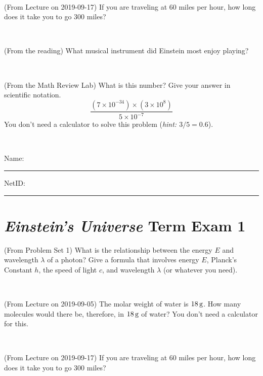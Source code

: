 \documentclass[12pt, letterpaper]{article}
\begin{document}
\vfill ~

\begin{problem} (From Lecture on 2019-09-17)
If you are traveling at 60 miles per hour, how long does
it take you to go 300 miles?
\end{problem}


\vfill ~

\begin{problem} (From the reading)
What musical instrument did Einstein most enjoy playing?
\end{problem}


\vfill ~

\begin{problem} (From the Math Review Lab)
What is this number? Give your answer in scientific notation.
$$
\frac{(7\times10^{-34})\times(3\times10^8)}{5\times10^{-7}}
$$
You don't need a calculator to solve this problem (\textit{hint: $3/5=0.6$}).
\end{problem}


\vfill ~


\cleardoublepage



\noindent
Name: \rule[-1ex]{0.60\textwidth}{0.1pt}
NetID: \rule[-1ex]{0.20\textwidth}{0.1pt}

\section*{\textsl{Einstein's Universe} Term Exam 1}
\setcounter{problem}{1}


\begin{problem} (From Problem Set 1)
What is the relationship between the energy $E$ and wavelength
$\lambda$ of a photon? Give a formula that involves energy $E$,
Planck's Constant $h$, the speed of light $c$, and wavelength
$\lambda$ (or whatever you need).
\end{problem}

\vfill ~

\begin{problem} (From Lecture on 2019-09-05)
The molar weight of water is $18\,\mathrm{g}$. How many molecules would there
be, therefore, in $18\,\mathrm{g}$ of water? You don't need a calculator for
this.
\end{problem}


\vfill ~

\begin{problem} (From Lecture on 2019-09-17)
If you are traveling at 60 miles per hour, how long does
it take you to go 300 miles?
\end{problem}
\end{document}
